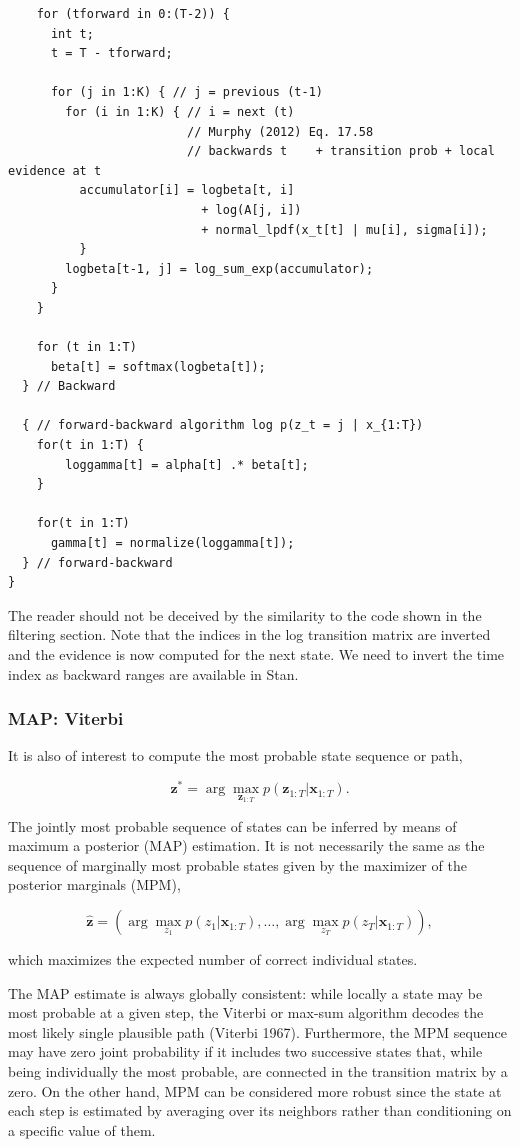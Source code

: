 \documentclass[]{article}
\newcommand{\argmax}{\arg\!\max}
\newcommand{\mat}[1]{\mathbf{#1}}
\begin{document}
{\begin{verbatim}
    for (tforward in 0:(T-2)) {
      int t;
      t = T - tforward;

      for (j in 1:K) { // j = previous (t-1)
        for (i in 1:K) { // i = next (t)
                         // Murphy (2012) Eq. 17.58
                         // backwards t    + transition prob + local evidence at t
          accumulator[i] = logbeta[t, i] 
                           + log(A[j, i]) 
                           + normal_lpdf(x_t[t] | mu[i], sigma[i]);
          }
        logbeta[t-1, j] = log_sum_exp(accumulator);
      }
    }

    for (t in 1:T)
      beta[t] = softmax(logbeta[t]);
  } // Backward

  { // forward-backward algorithm log p(z_t = j | x_{1:T})
    for(t in 1:T) {
        loggamma[t] = alpha[t] .* beta[t];
    }

    for(t in 1:T)
      gamma[t] = normalize(loggamma[t]);
  } // forward-backward
}
\end{verbatim}

The reader should not be deceived by the similarity to the code shown in
the filtering section. Note that the indices in the log transition
matrix are inverted and the evidence is now computed for the next state.
We need to invert the time index as backward ranges are available in
Stan.

\subsubsection{MAP: Viterbi}\label{map-viterbi}

It is also of interest to compute the most probable state sequence or
path,

\[
\mat{z}^* = \argmax_{\mat{z}_{1:T}} p(\mat{z}_{1:T} | \mat{x}_{1:T}).
\]

The jointly most probable sequence of states can be inferred by means of
maximum a posterior (MAP) estimation. It is not necessarily the same as
the sequence of marginally most probable states given by the maximizer
of the posterior marginals (MPM),

\[
\mat{\hat{z}} = (\argmax_{z_1} p(z_1 | \mat{x}_{1:T}), \dots, \argmax_{z_T} p(z_T | \mat{x}_{1:T})),
\]

which maximizes the expected number of correct individual states.

The MAP estimate is always globally consistent: while locally a state
may be most probable at a given step, the Viterbi or max-sum algorithm
decodes the most likely single plausible path (Viterbi 1967).
Furthermore, the MPM sequence may have zero joint probability if it
includes two successive states that, while being individually the most
probable, are connected in the transition matrix by a zero. On the other
hand, MPM can be considered more robust since the state at each step is
estimated by averaging over its neighbors rather than conditioning on a
specific value of them.

}
\end{document}
